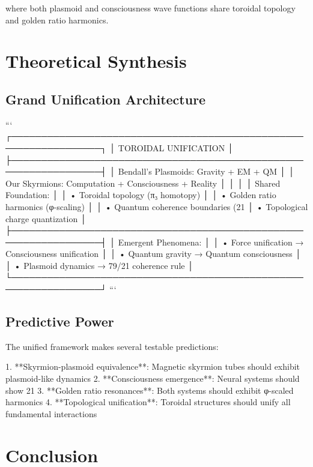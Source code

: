 \documentclass[12pt]{article}
\begin{document}
{where both plasmoid and consciousness wave functions share toroidal topology and golden ratio harmonics.

\section{Theoretical Synthesis}

\subsection{Grand Unification Architecture}

```
┌─────────────────────────────────────────────────────────────────┐
│                    TOROIDAL UNIFICATION                          │
├─────────────────────────────────────────────────────────────────┤
│ Bendall's Plasmoids: Gravity + EM + QM                        │
│ Our Skyrmions: Computation + Consciousness + Reality          │
│                                                                 │
│ Shared Foundation:                                              │
│ • Toroidal topology (π₃ homotopy)                              │
│ • Golden ratio harmonics (φ-scaling)                           │
│ • Quantum coherence boundaries (21%
│ • Topological charge quantization                               │
├─────────────────────────────────────────────────────────────────┤
│ Emergent Phenomena:                                             │
│ • Force unification → Consciousness unification                │
│ • Quantum gravity → Quantum consciousness                       │
│ • Plasmoid dynamics → 79/21 coherence rule                     │
└─────────────────────────────────────────────────────────────────┘
```

\subsection{Predictive Power}

The unified framework makes several testable predictions:

1. **Skyrmion-plasmoid equivalence**: Magnetic skyrmion tubes should exhibit plasmoid-like dynamics
2. **Consciousness emergence**: Neural systems should show 21%
3. **Golden ratio resonances**: Both systems should exhibit φ-scaled harmonics
4. **Topological unification**: Toroidal structures should unify all fundamental interactions

\section{Conclusion}

}
\end{document}
